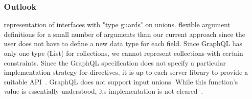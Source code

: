 \begin{frame}\frametitle{Outlook}

\begin{itemize}
     representation of interfaces with "type guards" on unions. 
     flexible argument definitions for a small number of arguments than our current approach since the user does not have to define a new data type for each field. 
     Since GraphQL has only one type (List) for collections, we cannot represent collections with certain constraints. 
    Since the GraphQL specification does not specify a particular implementation strategy for directives, it is up to each server library to provide a suitable API~\cite{schema-directives}.
     GraphQL does not support input unions. While this function's value is essentially understood, its implementation is not cleared~\cite{gql-spec-input-unions}. 

\end{itemize}

\end{frame}

